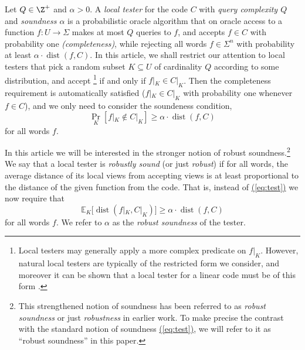 \documentclass{toc}
\renewcommand{\eqref}[1]{\hyperref[#1]{(\ref*{#1})}}
\theoremstyle{plain}
\DeclareMathOperator{\dist}{dist} %
\newcommand{\E}{{\mathbb{E}}}
\begin{document}
%
%
%
Let $Q\in\Z^+$ and $\alpha > 0$.   %
A \emph{local tester} for the code $C$
with \emph{query complexity $Q$} and \emph{soundness $\alpha$}  %
is a probabilistic oracle algorithm that
on oracle access to a function $f:U \to \Sigma$
makes at most $Q$ queries to $f$, and accepts $f \in C$
with probability one
\emph{(completeness)}, %
%
%
while rejecting %
%
all words $f\in\Sigma^n$  %
with
probability at least $\alpha \cdot \dist(f,C)$.
%
%
In this %
article,  %
we shall restrict our attention to local testers that pick a random subset 
 $K \subseteq U$ of cardinality $Q$ according to some distribution, and 
accept%
%
\footnote{Local testers may generally apply a more complex predicate on $f|_K$. However, natural local testers are typically of the restricted form we consider, and moreover it can be shown that a local tester for a linear code
must be of this form \cite{BenSassonHR2005}.}
if and only if $f|_K \in C|_K$.   %
%
%
%
%
%
Then the completeness requirement is automatically satisfied
($f|_K \in C|_K$ with probability one whenever $f \in C$),
and we only need to consider the soundeness condition,   %
\begin{equation}\label{eq:test}
\Pr_{K}[f|_K \notin C|_K ] \geq \alpha \cdot \dist(f,C)
\end{equation}
%
for all words $f$.  %

In this %
article  %
we will be interested in the stronger notion of robust soundness.\footnote{This strengthened notion of soundness has been referred to as \emph{robust soundness} \cite{BenSassonGHSV2006,BenSassonS2006} or just \emph{robustness} \cite{GuoHS2015} in earlier
%
work.  %
To make precise the contrast with the standard notion of soundness \eqref{eq:test}, we will refer to %
it  %
as ``robust soundness''  in this
%
paper.}   %
We say that a local tester
%
%
%
is \emph{robustly sound} (or just \emph{robust}) if
%
for all words,   %
the average distance of its local views from accepting views is
at least  %
%
proportional to the distance of the given function from the code.
That is, 
%
%
%
%
%
instead of \eqref{eq:test} we now require that
\begin{equation}\label{eq:robust}
\E_K\big[\dist(f|_K,C|_K)\big] \geq \alpha \cdot \dist(f,C)
\end{equation}
%
for all words $f$.  %
%
%
We   %
refer to $\alpha$ as the \emph{robust soundness} 
of the tester.
\end{document}
